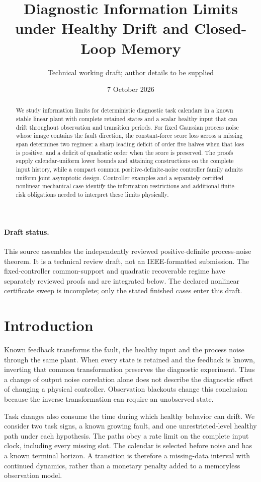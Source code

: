 \documentclass[11pt]{article}
\title{Diagnostic Information Limits under Healthy Drift and Closed-Loop Memory}
\author{Technical working draft; author details to be supplied}
\date{7 October 2026}
\begin{document}
\maketitle
\begin{abstract}
We study information limits for deterministic diagnostic task calendars
in a known stable linear plant with complete retained states and a scalar
healthy input that can drift throughout observation and transition periods.
For fixed Gaussian process noise whose image contains the fault direction,
the constant-force score loss across a missing span determines two regimes:
a sharp leading deficit of order five halves when that loss is positive,
and a deficit of quadratic order when the score is preserved.
The proofs supply calendar-uniform lower bounds and attaining constructions
on the complete input history, while a compact common positive-definite-noise
controller family admits uniform joint asymptotic design.
Controller examples and a separately certified nonlinear mechanical case
identify the information restrictions and additional finite-risk obligations
needed to interpret these limits physically.
\end{abstract}

\paragraph{Draft status.}
This source assembles the independently reviewed positive-definite process-noise
theorem. It is a technical review draft, not an IEEE-formatted submission.
The fixed-controller common-support and quadratic recoverable regime
have separately reviewed proofs and are integrated below.
The declared nonlinear
certificate sweep is incomplete; only the stated finished cases enter this draft.

\section{Introduction}
Known feedback transforms the fault, the healthy input and the process noise
through the same plant. When every state is retained and the feedback is known,
inverting that common transformation preserves the diagnostic experiment.
Thus a change of output noise correlation alone does not describe the diagnostic
effect of changing a physical controller. Observation blackouts change this
conclusion because the inverse transformation can require an unobserved state.

Task changes also consume the time during which healthy behavior can drift.
We consider two task signs, a known growing fault, and one unrestricted-level
healthy path under each hypothesis. The paths obey a rate limit on the complete
input clock, including every missing slot. The calendar is selected before noise
and has a known terminal horizon. A transition is therefore a missing-data
interval with continued dynamics, rather than a monetary penalty added to a
memoryless observation model.
\end{document}
